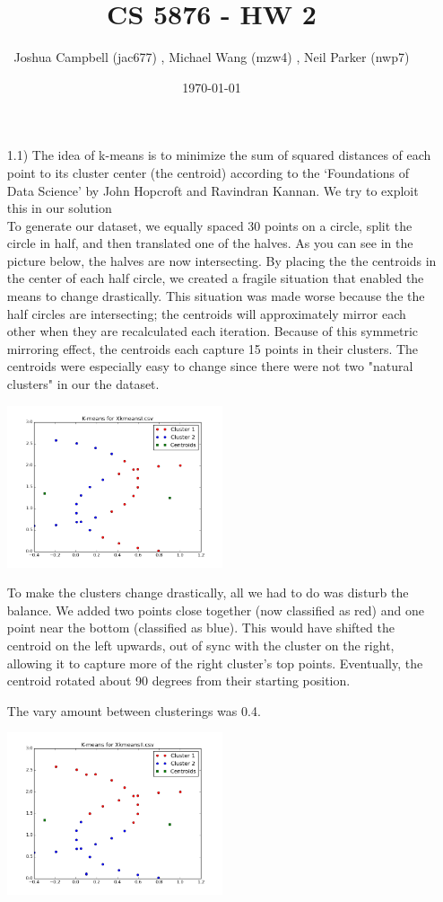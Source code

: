 \documentclass[12pt]{article}
\title{CS 5876 - HW 2}
\author{Joshua Campbell (jac677) , Michael Wang (mzw4) , Neil Parker (nwp7) }
\date{\today}
\begin{document}
\maketitle

\begin{enumerate}

\item[1.1)]
The idea of k-means is to minimize the sum of squared distances of each point to its cluster center (the centroid) according to the `Foundations of Data Science' by John Hopcroft and Ravindran Kannan. We try to exploit this in our solution\\
To generate our dataset, we equally spaced 30 points on a circle, split the circle in half, and then translated one of the halves. As you can see in the picture below, the halves are now intersecting. By placing the the centroids in the center of each half circle, we created a fragile situation that enabled the means to change drastically. This situation was made worse because the the half circles are intersecting; the centroids will approximately mirror each other when they are recalculated each iteration. Because of this symmetric mirroring effect, the centroids each capture 15 points in their clusters. The centroids were especially easy to change since there were not two "natural clusters" in our the dataset.

\includegraphics[width=0.5\textwidth]{K-means_for_XkmeansI.png}

To make the clusters change drastically, all we had to do was disturb the balance. We added two points close together (now classified as red) and one point near the bottom (classified as blue). This would have shifted the centroid on the left upwards, out of sync with the cluster on the right, allowing it to capture more of the right cluster's top points. Eventually, the centroid rotated about 90 degrees from their starting position.

The vary amount between clusterings was 0.4.

\includegraphics[width=0.5\textwidth]{K-means_for_XkmeansII.png}


\end{enumerate}
\end{document}
